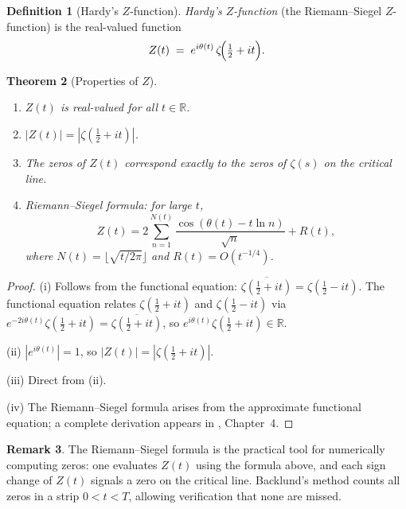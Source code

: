 \documentclass[12pt,a4paper]{amsart}
\newtheorem{theorem}{Theorem}[section]
\theoremstyle{definition}
\newtheorem{definition}[theorem]{Definition}
\newtheorem{remark}[theorem]{Remark}
\newcommand{\R}{\mathbb{R}}
\begin{document}
\begin{definition}[Hardy's $Z$-function]
\label{def:Z_function}
\emph{Hardy's $Z$-function} (the Riemann--Siegel $Z$-function) is the
real-valued function
\[
  Z(t) \;=\; e^{i\theta(t)}\,\zeta\!\Bigl(\tfrac{1}{2} + it\Bigr).
\]
\end{definition}

\begin{theorem}[Properties of $Z$]
\label{thm:Z_properties}
\begin{enumerate}
  \item[\textup{(i)}] $Z(t)$ is real-valued for all $t \in \R$.
  \item[\textup{(ii)}] $|Z(t)| = |\zeta(\tfrac{1}{2} + it)|$.
  \item[\textup{(iii)}] The zeros of $Z(t)$ correspond exactly to the
    zeros of $\zeta(s)$ on the critical line.
  \item[\textup{(iv)}] Riemann--Siegel formula: for large $t$,
    \[
      Z(t) = 2\sum_{n=1}^{N(t)} \frac{\cos(\theta(t) - t\ln n)}{\sqrt{n}}
      + R(t),
    \]
    where $N(t) = \lfloor\sqrt{t/2\pi}\rfloor$ and
    $R(t) = O(t^{-1/4})$.
\end{enumerate}
\end{theorem}

\begin{proof}
(i) Follows from the functional equation: $\overline{\zeta(\tfrac{1}{2}+it)}
= \zeta(\tfrac{1}{2}-it)$.  The functional equation relates
$\zeta(\tfrac{1}{2}+it)$ and $\zeta(\tfrac{1}{2}-it)$ via
$e^{-2i\theta(t)}\zeta(\tfrac{1}{2}+it) = \overline{\zeta(\tfrac{1}{2}+it)}$,
so $e^{i\theta(t)}\zeta(\tfrac{1}{2}+it) \in \R$.

(ii) $|e^{i\theta(t)}| = 1$, so $|Z(t)| = |\zeta(\tfrac{1}{2}+it)|$.

(iii) Direct from (ii).

(iv) The Riemann--Siegel formula arises from the approximate functional
equation; a complete derivation appears in \cite{Titchmarsh1986},
Chapter~4.
\end{proof}

\begin{remark}
The Riemann--Siegel formula is the practical tool for numerically
computing zeros: one evaluates $Z(t)$ using the formula above,
and each sign change of $Z(t)$ signals a zero on the critical line.
Backlund's method counts all zeros in a strip $0 < t < T$, allowing
verification that none are missed.
\end{remark}
\end{document}
